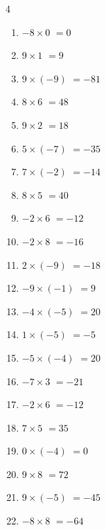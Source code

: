 \begin{multicols}{4}
\begin{enumerate}
  \item $-8\times 0$
        $=0$

  \item $9\times 1$
        $=9$

  \item $9\times (-9)$
        $=-81$

  \item $8\times 6$
        $=48$

  \item $9\times 2$
        $=18$

\columnbreak %

  \item $5\times (-7)$
        $=-35$

  \item $7\times (-2)$
        $=-14$

  \item $8\times 5$
        $=40$

  \item $-2\times 6$
        $=-12$

  \item $-2\times 8$
        $=-16$

  \item $2\times (-9)$
        $=-18$

  \item $-9\times (-1)$
        $=9$

  \item $-4\times (-5)$
        $=20$

  \item $1\times (-5)$
        $=-5$

  \item $-5\times (-4)$
        $=20$

  \item $-7\times 3$
        $=-21$

  \item $-2\times 6$
        $=-12$

  \item $7\times 5$
        $=35$

  \item $0\times (-4)$
        $=0$

  \item $9\times 8$
        $=72$

  \item $9\times (-5)$
        $=-45$

  \item $-8\times 8$
        $=-64$


\end{enumerate}
\end{multicols}
